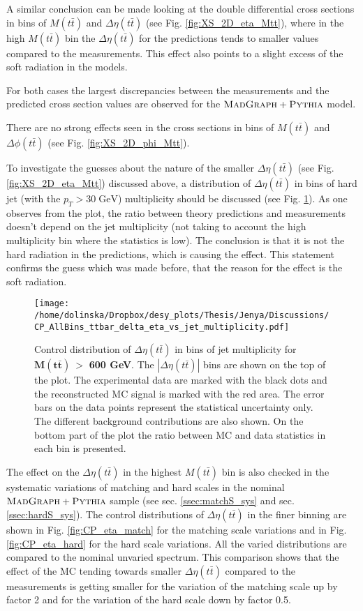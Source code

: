 A similar conclusion can be made looking at the double differential cross sections in bins of $M(t\bar{t})$ and $\Delta\eta(t\bar{t})$ (see Fig. \ref{fig:XS_2D_eta_Mtt}),
where in the high $M(t\bar{t})$ bin the $\Delta\eta(t\bar{t})$ for the predictions tends to smaller values compared to the measurements.
This effect also points to a slight excess of the soft radiation in the models.

For both cases the largest discrepancies between the measurements and the predicted cross section values are observed for the $\textsc{MadGraph}+\textsc{Pythia}$
model.

There are no strong effects seen in the cross sections in bins of $M(t\bar{t})$ and $\Delta\phi(t\bar{t})$ (see Fig. \ref{fig:XS_2D_phi_Mtt}).

To investigate the guesses about the nature of the smaller $\Delta\eta(t\bar{t})$ (see Fig. \ref{fig:XS_2D_eta_Mtt}) discussed above,
a distribution of $\Delta\eta(t\bar{t})$ in bins of hard jet (with the $p_{T} > 30\;\text{GeV}$) multiplicity should be discussed
(see Fig. \ref{fig:eta_jetMult}). As one observes from the plot, the ratio between theory predictions and measurements doesn't depend
on the jet multiplicity (not taking to account the high multiplicity bin where the statistics is low). The conclusion is that it
is not the hard radiation in the predictions, which is causing the effect. This statement confirms the guess which was made before, that
the reason for the effect is the soft radiation.

\begin{figure}[t]
  \centering
  \texttt{[image: /home/dolinska/Dropbox/desy\_plots/Thesis/Jenya/Discussions/CP\_AllBins\_ttbar\_delta\_eta\_vs\_jet\_multiplicity.pdf]}
  \caption{Control distribution of $\Delta\eta({t\bar{t}})$ in bins of jet multiplicity for $\mathbf{M(t\bar{t})\: >}$ \textbf{600 GeV}. The $|\Delta\eta(t\bar{t})|$ 
  bins are shown on the top of the plot. The experimental data are marked with the black dots and the reconstructed MC signal is marked with the red area. The error
  bars on the data points represent the statistical uncertainty only. The 
  different background contributions are also shown. On the bottom part of the plot the ratio between MC and data statistics in each bin
  is presented.}
  \label{fig:eta_jetMult}
\end{figure}

The effect on the $\Delta\eta(t\bar{t})$ in the highest $M(t\bar{t})$ bin is also checked in the systematic variations of matching and hard scales in the nominal $\textsc{MadGraph}+\textsc{Pythia}$ sample 
(see sec. \ref{ssec:matchS_sys} and sec. \ref{ssec:hardS_sys}). The control distributions of $\Delta\eta(t\bar{t})$ in the finer binning are shown 
in Fig. \ref{fig:CP_eta_match} for the matching scale variations and in Fig. \ref{fig:CP_eta_hard} for the hard scale variations. All the varied 
distributions are compared to the nominal unvaried spectrum. This comparison shows that the effect of the MC tending towards smaller $\Delta\eta(t\bar{t})$
compared to the measurements is getting smaller for the variation of the matching scale up by factor 2 and for the variation of the hard scale down 
by factor 0.5.

